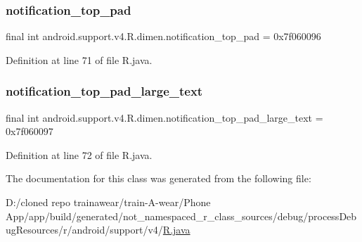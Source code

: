 \subsubsection{\texorpdfstring{notification\_top\_pad}{notification\_top\_pad}}
{\footnotesize\ttfamily final int android.\+support.\+v4.\+R.\+dimen.\+notification\+\_\+top\+\_\+pad = 0x7f060096\hspace{0.3cm}{\ttfamily [static]}}



Definition at line 71 of file R.\+java.

\mbox{\label{classandroid_1_1support_1_1v4_1_1_r_1_1dimen_a015ea491d800aa6186dff18e64c0c947}} 
\subsubsection{\texorpdfstring{notification\_top\_pad\_large\_text}{notification\_top\_pad\_large\_text}}
{\footnotesize\ttfamily final int android.\+support.\+v4.\+R.\+dimen.\+notification\+\_\+top\+\_\+pad\+\_\+large\+\_\+text = 0x7f060097\hspace{0.3cm}{\ttfamily [static]}}



Definition at line 72 of file R.\+java.



The documentation for this class was generated from the following file\+:\begin{DoxyCompactItemize}
\item 
D\+:/cloned repo trainawear/train-\/\+A-\/wear/\+Phone App/app/build/generated/not\+\_\+namespaced\+\_\+r\+\_\+class\+\_\+sources/debug/process\+Debug\+Resources/r/android/support/v4/\mbox{\hyperlink{process_debug_resources_2r_2android_2support_2v4_2_r_8java}{R.\+java}}\end{DoxyCompactItemize}
